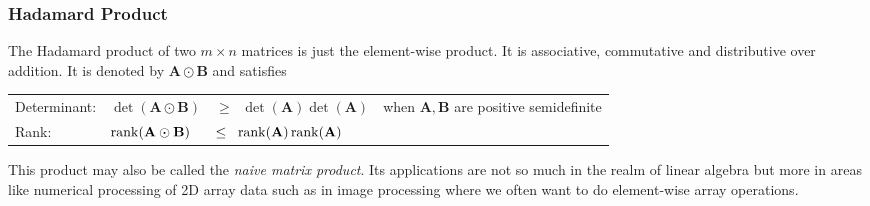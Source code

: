 






\subsubsection{Hadamard Product} The Hadamard product of two $m \times n$ matrices is just the element-wise product. It is associative, commutative and distributive over addition. It is denoted by $\mathbf{A} \odot \mathbf{B}$ and satisfies

\medskip
\begin{tabular}{l l l l}
Determinant: & $\det(\mathbf{A} \odot \mathbf{B})$ 
             & $\geq \;\; \det(\mathbf{A})  \det(\mathbf{A})$   
             & when $\mathbf{A,B}$ are positive semidefinite \\
Rank:        & $\operatorname{rank}(\mathbf{A} \odot \mathbf{B}) $
             & $\leq \;\; \operatorname{rank}(\mathbf{A}) \operatorname{rank}(\mathbf{A})$     \\
\end{tabular}
\medskip

This product may also be called the \emph{naive matrix product}. Its applications are not so much in the realm of linear algebra but more in areas like numerical processing of 2D array data such as in image processing where we often want to do element-wise array operations. 

